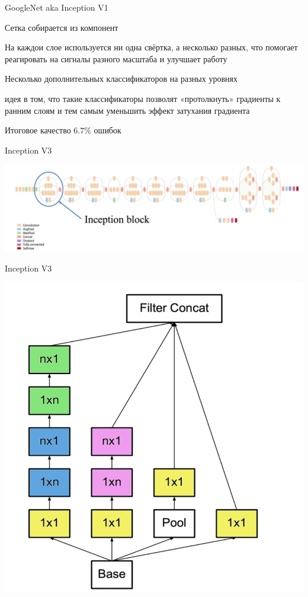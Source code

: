 \documentclass[notes,12pt, aspectratio=169]{beamer}
\newenvironment{wideitemize}{\itemize\addtolength{\itemsep}{10pt}}{\enditemize}
\begin{document}
\begin{frame}{GoogleNet aka Inception V1}
\begin{wideitemize}
\item  Сетка собирается из компонент 

\item На каждои слое используется ни одна свёртка, а несколько разных, что помогает реагировать на сигналы разного масштаба и улучшает работу

\item Несколько дополнительных классификаторов на разных уровнях

\item идея в том, что такие классификаторы позволят «протолкнуть» градиенты к ранним слоям и тем самым уменьшить эффект затухания градиента

\item Итоговое качество $6.7\%$ ошибок 
\end{wideitemize}
\end{frame}

\begin{frame}{Inception V3}
\begin{center}
\includegraphics[width=.9\linewidth]{inception3.png}
\end{center}
\end{frame}

\begin{frame}{Inception V3}
\begin{center}
\includegraphics[width=.5\linewidth]{block3.png}
\end{center}
\end{frame}
\end{document}
